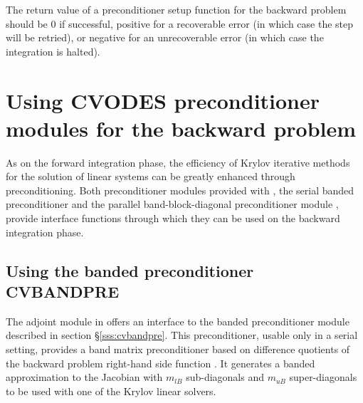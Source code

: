 {
  The return value of a preconditioner setup function for the backward
  problem should be $0$ if successful, 
  positive for a recoverable error (in which case the step will be retried),     
  or negative for an unrecoverable error (in which case the integration is halted).
}
{}
\section{Using CVODES preconditioner modules for the backward problem}

As on the forward integration phase, the efficiency of Krylov iterative methods 
for the solution of linear systems can be greatly enhanced through preconditioning.
Both preconditioner modules provided with {\sundials}, the serial banded
preconditioner {\cvbandpre} and the parallel band-block-diagonal preconditioner
module {\cvbbdpre}, provide interface functions through which they can be used 
on the backward integration phase.


\subsection{Using the banded preconditioner CVBANDPRE}

The adjoint module in {\cvodes} offers an interface to the banded 
preconditioner module {\cvbandpre} described in section \S\ref{sss:cvbandpre}.
This preconditioner, usable only in a serial setting, provides a band matrix 
preconditioner based on difference quotients of the backward problem right-hand 
side function .  It generates
a banded approximation to the Jacobian with $m_{lB}$ sub-diagonals and $m_{uB}$
super-diagonals to be used with one of the Krylov linear solvers.

